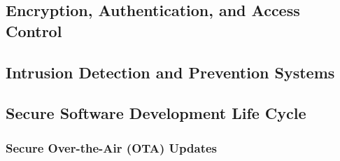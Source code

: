 \subsection{Encryption, Authentication, and Access Control}\label{subsec:encryption-authentication-and-access-control}
\subsection{Intrusion Detection and Prevention Systems}\label{subsec:intrusion-detection-and-prevention-systems}
\subsection{Secure Software Development Life Cycle}\label{subsec:secure-software-development-life-cycle}
\subsubsection{Secure Over-the-Air (OTA) Updates}\label{subsubsec:secure-over-the-air-ota-updates}
